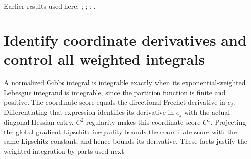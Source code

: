 \documentclass[11pt,a4paper]{article}
\begin{document}
Earlier results used here: \cite[Section~3.26.10]{LangevinLean2026ULASC}; \cite[Section~3.26.3]{LangevinLean2026ULASC}; \cite[Section~3.26.9]{LangevinLean2026ULASC}; \cite[Section~3.27.5]{LangevinLean2026ULASC}.

\section{\texorpdfstring{Identify coordinate derivatives and control all weighted integrals}{Identify coordinate derivatives and control all weighted integrals}}


A normalized Gibbs integral is integrable exactly when its exponential-weighted Lebesgue integrand is integrable, since the partition function is finite and positive. The coordinate score equals the directional Frechet derivative in \(e_j\). Differentiating that expression identifies its derivative in \(e_j\) with the actual diagonal Hessian entry. \(C^{2}\) regularity makes this coordinate score \(C^{1}\). Projecting the global gradient Lipschitz inequality bounds the coordinate score with the same Lipschitz constant, and hence bounds its derivative. These facts justify the weighted integration by parts used next.
\end{document}
